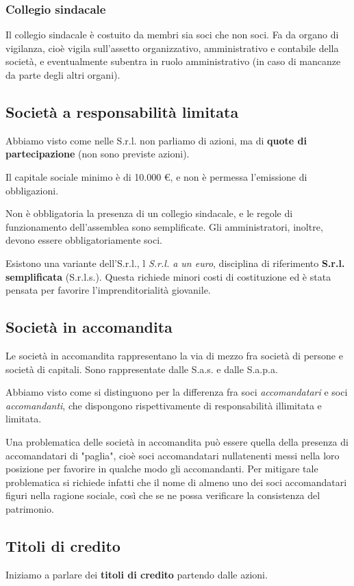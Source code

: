 \documentclass[a4paper,11pt]{article}
\begin{document}
\subsubsection{Collegio sindacale}
Il collegio sindacale è costuito da membri sia soci che non soci.
Fa da organo di vigilanza, cioè vigila sull'assetto organizzativo, amministrativo e contabile della società, e eventualmente subentra in ruolo amministrativo (in caso di mancanze da parte degli altri organi). 

\subsection{Società a responsabilità limitata}
Abbiamo visto come nelle S.r.l. non parliamo di azioni, ma di \textbf{quote di partecipazione} (non sono previste azioni).

Il capitale sociale minimo è di 10.000 €, e non è permessa l'emissione di obbligazioni.

Non è obbligatoria la presenza di un collegio sindacale, e le regole di funzionamento dell'assemblea sono semplificate.
Gli amministratori, inoltre, devono essere obbligatoriamente soci.

Esistono una variante dell'S.r.l., l \textit{S.r.l. a un euro}, disciplina di riferimento \textbf{S.r.l. semplificata} (S.r.l.s.).
Questa richiede minori costi di costituzione ed è stata pensata per favorire l'imprenditorialità giovanile.

\subsection{Società in accomandita}
Le società in accomandita rappresentano la via di mezzo fra società di persone e società di capitali.
Sono rappresentate dalle S.a.s. e dalle S.a.p.a.

Abbiamo visto come si distinguono per la differenza fra soci \textit{accomandatari} e soci \textit{accomandanti}, che dispongono rispettivamente di responsabilità illimitata e limitata.

Una problematica delle società in accomandita può essere quella della presenza di accomandatari di "paglia", cioè soci accomandatari nullatenenti messi nella loro posizione per favorire in qualche modo gli accomandanti. 
Per mitigare tale problematica si richiede infatti che il nome di almeno uno dei soci accomandatari figuri nella ragione sociale, così che se ne possa verificare la consistenza del patrimonio.

\subsection{Titoli di credito}
Iniziamo a parlare dei \textbf{titoli di credito} partendo dalle azioni.
\end{document}
